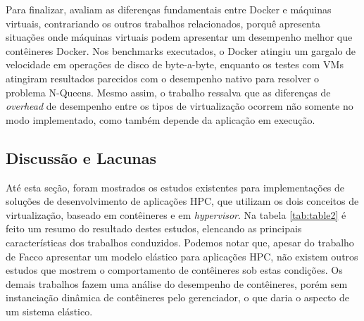 \documentclass[twoside,english,brazilian]{UNISINOSartigo}
\begin{document}
Para finalizar,  avaliam as diferenças fundamentais entre Docker e máquinas virtuais, contrariando os outros trabalhos relacionados, porquê apresenta situações onde máquinas virtuais podem apresentar um desempenho melhor que contêineres Docker. Nos benchmarks executados, o Docker atingiu um gargalo de velocidade em operações de disco de byte-a-byte, enquanto os testes com VMs atingiram resultados parecidos com o desempenho nativo para resolver o problema N-Queens. Mesmo assim, o trabalho ressalva que as diferenças de \textit{overhead} de desempenho entre os tipos de virtualização ocorrem não somente no modo implementado, como também depende da aplicação em execução. 

\subsection{Discussão e Lacunas}
\label{comparacao}
Até esta seção, foram mostrados os estudos existentes para implementações de soluções de desenvolvimento de aplicações HPC, que utilizam os dois conceitos de virtualização, baseado em contêineres e em \textit{hypervisor}. Na tabela \ref{tab:table2} é feito um resumo do resultado destes estudos, elencando as principais características dos trabalhos conduzidos. Podemos notar que, apesar do trabalho de Facco  apresentar um modelo elástico para aplicações HPC, não existem outros estudos que mostrem o comportamento de contêineres sob estas condições. Os demais trabalhos fazem uma análise do desempenho de contêineres, porém sem instanciação dinâmica de contêineres pelo gerenciador, o que daria o aspecto de um sistema elástico.
\end{document}
